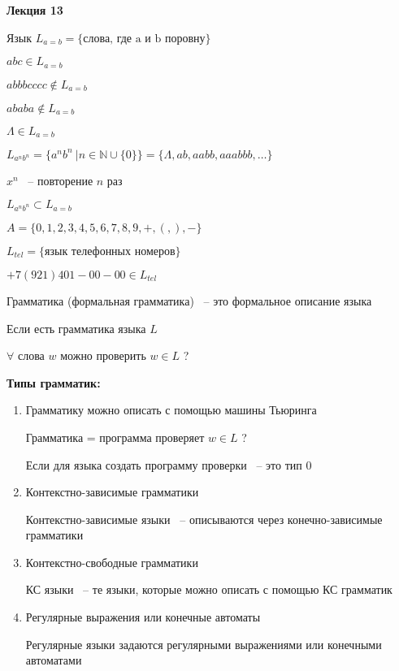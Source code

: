 \documentclass[russian]{lecture-notes}
\begin{document}
    \textbf{Лекция 13}

    \begin{example}
        Язык $L_{a = b} = \{ \textrm{слова, где a и b поровну}\}$

        $abc \in L_{a = b}$

        $abbbcccc \notin L_{a = b}$

        $ababa \notin L_{a = b}$

        $\Lambda \in L_{a = b}$
    \end{example}

    \begin{example}

        $L_{a^n b^n} = \{ a^n b^n \: | n \in \mathbb{N} \cup \{0 \} \} = \{ \Lambda, ab, aabb, aaabbb, \dots \}$

        $x^n$ ~-- повторение $n$ раз

        $L_{a^n b^n} \subset L_{a = b}$
    \end{example}

    \begin{example}
        $A = \{ 0, 1, 2, 3, 4, 5, 6, 7, 8, 9, +, (, ), - \}$

        $L_{tel} = \{ \textrm{язык телефонных номеров} \}$

        $+7 (921) 401-00-00 \in L_{tel}$
    \end{example}

    \begin{definition}
        Грамматика (формальная грамматика) ~-- это формальное описание языка

        Если есть грамматика языка $L$

        $\forall$ слова $w$ можно проверить $w \in L$ ?
    \end{definition}

    \textbf{Типы грамматик:}

    \begin{enumerate}
        \addtocounter{enumi}{-1}
        \item{
            Грамматику можно описать с помощью машины Тьюринга

            Грамматика = программа проверяет $w \in L$ ?

            Если для языка создать программу проверки ~-- это тип 0
        }
        \item{
            Контекстно-зависимые грамматики

            Контекстно-зависимые языки ~-- описываются через конечно-зависимые грамматики
        }
        \item{
            Контекстно-свободные грамматики

            КС языки ~-- те языки, которые можно описать с помощью КС грамматик
        }
        \item{
            Регулярные выражения или конечные автоматы

            Регулярные языки задаются регулярными выражениями или конечными автоматами
        }
    \end{enumerate}
\end{document}
